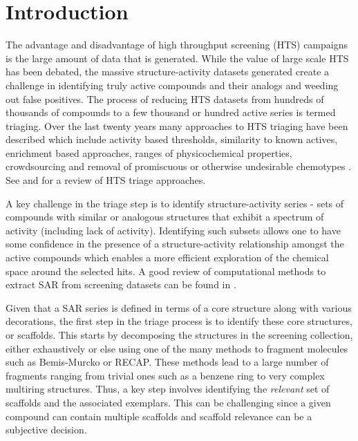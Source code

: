 \documentclass[journal=jacsat,manuscript=article]{achemso}
\begin{document}
\section{Introduction}

The advantage and disadvantage of high throughput screening (HTS)
campaigns is the large amount of data that is generated. While the
value of large scale HTS has been debated\cite{Macarron:2011qv}, the
massive structure-activity datasets generated create a challenge in
identifying truly active compounds and their analogs and weeding out
false positives. The process of reducing HTS datasets from hundreds of
thousands of compounds to a few thousand or hundred active series is
termed triaging. Over the last twenty years many approaches to HTS
triaging have been described which include activity based
thresholds\cite{Mulrooney:2013aa}, similarity to known
actives\cite{Shanmugasundaram:2005aa}, enrichment based
approaches\cite{Varin2010CSE,Pu:2012wf}, ranges of physicochemical
properties\cite{Cox:2012qy}, crowdsourcing\cite{Peng:2013qp} and
removal of promiscuous or otherwise undesirable chemotypes
\cite{Dahlin:2014fp}. See \citet{Shun:2011sy} and
\citet{Langer:2009mw} for a review of HTS triage approaches.

A key challenge in the triage step is to identify structure-activity
series - sets of compounds with similar or analogous structures that
exhibit a spectrum of activity (including lack of
activity). Identifying such subsets allows one to have some confidence
in the presence of a structure-activity relationship amongst the
active compounds which enables a more efficient exploration of the
chemical space around the selected hits. A good review of
computational methods to extract SAR from screening datasets can be
found in \citet{Wawer2010review}.

Given that a SAR series is defined in terms of a core structure along
with various decorations, the first step in the triage process is to
identify these core structures, or scaffolds. This starts by
decomposing the structures in the screening collection, either exhaustively or
else using one of the many methods to fragment molecules such
as Bemis-Murcko\cite{BemisMurcko1999,BemisMurcko1996} or RECAP\cite{Lewell:1998aa}. These methods lead to a large number of
fragments ranging from trivial ones such as a benzene ring to very complex
multiring structures. Thus, a key step involves identifying the \emph{relevant} set of
scaffolds and the associated exemplars. This can be challenging since a given
compound can contain multiple scaffolds and scaffold relevance can be a subjective decision\cite{Hu:2016aa}.
\end{document}
